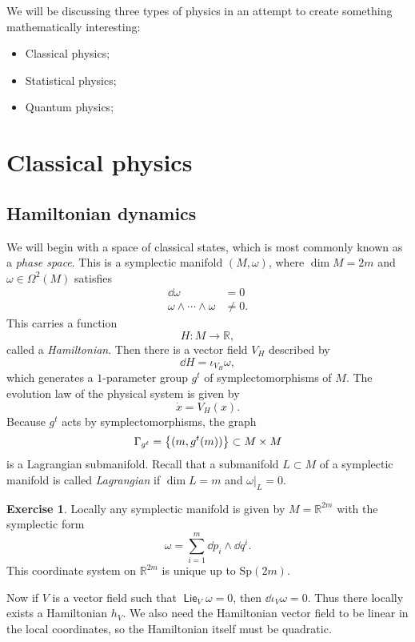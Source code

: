 \documentclass[leqno, openany]{memoir}
\theoremstyle{definition}
\newtheorem{exer}[thm]{Exercise}
\theoremstyle{remark}
\theoremstyle{plain}
\theoremstyle{definition}
\theoremstyle{remark}
\newcommand{\R}{\mathbb{R}}
\newcommand{\mr}[1]{\mathrm{#1}}
\newcommand{\ms}[1]{\mathsf{#1}}
\newcommand{\on}[1]{\operatorname{#1}}
\begin{document}
We will be discussing three types of physics in an attempt to create something mathematically interesting:
\begin{itemize}
\item Classical physics;
\item Statistical physics;
\item Quantum physics;
\end{itemize}

\section{Classical physics}
\label{sec:classical}

\subsection{Hamiltonian dynamics}
\label{subsec:hamiltonian}

We will begin with a space of classical states, which is most commonly known as a \textit{phase space}. This is a symplectic manifold $(M, \omega)$, where $\dim M = 2m$ and $\omega \in \Omega^2(M)$ satisfies
\begin{align*}
  \dd{\omega} &= 0 \\
  \omega \wedge \cdots \wedge \omega &\neq 0.
\end{align*}
This carries a function
\[ H \colon M \to \R, \]
called a \textit{Hamiltonian}. Then there is a vector field $V_H$ described by
\[ \dd{H} = \iota_{V_H} \omega, \]
which generates a $1$-parameter group $g^t$ of symplectomorphisms of $M$. The evolution law of the physical system is given by
\[ \dot{x} = V_H(x). \]
Because $g^t$ acts by symplectomorphisms, the graph
\[ \Gamma_{g^t} = \qty{(m, g^t(m))} \subset M \times M \]
is a Lagrangian submanifold. Recall that a submanifold $L \subset M$ of a symplectic manifold is called \textit{Lagrangian} if $\dim L = m$ and $\omega |_L = 0$.

\begin{exer}
  Locally any symplectic manifold is given by $M = \R^{2m}$ with the symplectic form
  \[ \omega = \sum_{i=1}^m \dd{p_i} \wedge \dd{q^i}. \]
  This coordinate system on $\R^{2m}$ is unique up to $\mr{Sp}(2m)$.
\end{exer}

Now if $V$ is a vector field such that $\on{\ms{Lie}}_V \omega = 0$, then $\dd{\iota_V \omega} = 0$. Thus there locally exists a Hamiltonian $h_V$. We also need the Hamiltonian vector field to be linear in the local coordinates, so the Hamiltonian itself must be quadratic.
\end{document}
